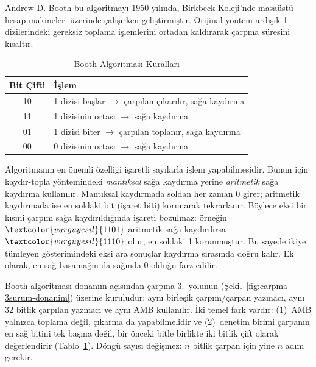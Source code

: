 \begin{bilginot}
Andrew D. Booth bu algoritmayı 1950 yılında, Birkbeck Koleji'nde masaüstü hesap makineleri üzerinde çalışırken geliştirmiştir. Orijinal yöntem ardışık 1 dizilerindeki gereksiz toplama işlemlerini ortadan kaldırarak çarpma süresini kısaltır.
\end{bilginot}

\begin{table}[htbp]
\centering
\caption{Booth Algoritması Kuralları}
\label{tab:booth-kurallar}
\begin{tabular}{c l}
\toprule
\textbf{Bit Çifti} & \textbf{İşlem} \\
\midrule
10 & 1 dizisi başlar $\rightarrow$ çarpılan çıkarılır, sağa kaydırma \\
11 & 1 dizisinin ortası $\rightarrow$ sağa kaydırma \\
01 & 1 dizisi biter $\rightarrow$ çarpılan toplanır, sağa kaydırma \\
00 & 0 dizisinin ortası $\rightarrow$ sağa kaydırma \\
\bottomrule
\end{tabular}
\end{table}

Algoritmanın en önemli özelliği işaretli sayılarla işlem yapabilmesidir. Bunun için kaydır-topla yöntemindeki \emph{mantıksal} sağa kaydırma yerine \emph{aritmetik} sağa kaydırma kullanılır. Mantıksal kaydırmada soldan her zaman 0 girer; aritmetik kaydırmada ise en soldaki bit (işaret biti) korunarak tekrarlanır. Böylece eksi bir kısmi çarpım sağa kaydırıldığında işareti bozulmaz: örneğin $\textcolor{vurguyesil}{1101}$ aritmetik sağa kaydırılırsa $\textcolor{vurguyesil}{1110}$ olur; en soldaki 1 korunmuştur. Bu sayede ikiye tümleyen gösterimindeki eksi ara sonuçlar kaydırma sırasında doğru kalır. Ek olarak, en sağ basamağın da sağında 0 olduğu farz edilir.

Booth algoritması donanım açısından çarpma 3.\ yolunun (Şekil~\ref{fig:carpma-3surum-donanim}) üzerine kuruludur: aynı birleşik çarpım/çarpan yazmacı, aynı 32 bitlik çarpılan yazmacı ve aynı AMB kullanılır. İki temel fark vardır: (1)~AMB yalnızca toplama değil, çıkarma da yapabilmelidir ve (2)~denetim birimi çarpanın en sağ bitini tek başına değil, bir önceki bitle birlikte iki bitlik çift olarak değerlendirir (Tablo~\ref{tab:booth-kurallar}). Döngü sayısı değişmez: $n$ bitlik çarpan için yine $n$ adım gerekir.

